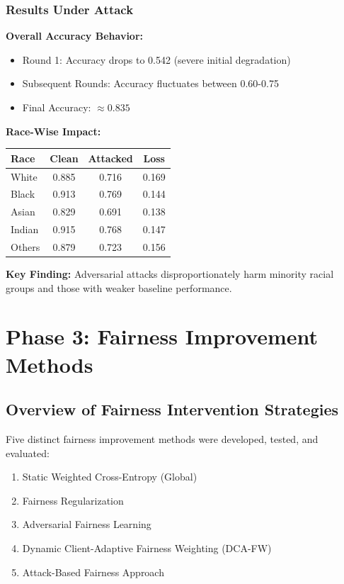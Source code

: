 \documentclass[11pt,a4paper]{report}
\begin{document}
\subsection{Results Under Attack}

\textbf{Overall Accuracy Behavior:}
\begin{itemize}
    \item Round 1: Accuracy drops to 0.542 (severe initial degradation)
    \item Subsequent Rounds: Accuracy fluctuates between 0.60-0.75
    \item Final Accuracy: $\approx 0.835$
\end{itemize}

\textbf{Race-Wise Impact:}
\begin{table}[h]
\centering
\begin{tabular}{lccc}
\toprule
\textbf{Race} & \textbf{Clean} & \textbf{Attacked} & \textbf{Loss} \\
\midrule
White & 0.885 & 0.716 & 0.169 \\
Black & 0.913 & 0.769 & 0.144 \\
Asian & 0.829 & 0.691 & 0.138 \\
Indian & 0.915 & 0.768 & 0.147 \\
Others & 0.879 & 0.723 & 0.156 \\
\bottomrule
\end{tabular}
\end{table}

\textbf{Key Finding:} Adversarial attacks disproportionately harm minority racial groups and those with weaker baseline performance.

\chapter{Phase 3: Fairness Improvement Methods}

\section{Overview of Fairness Intervention Strategies}

Five distinct fairness improvement methods were developed, tested, and evaluated:

\begin{enumerate}
    \item Static Weighted Cross-Entropy (Global)
    \item Fairness Regularization
    \item Adversarial Fairness Learning
    \item Dynamic Client-Adaptive Fairness Weighting (DCA-FW)
    \item Attack-Based Fairness Approach
\end{enumerate}
\end{document}
